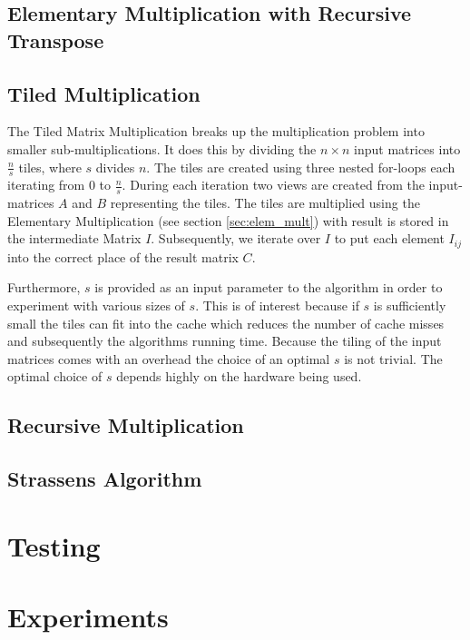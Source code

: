 \documentclass[12pt, a4paper]{article}
\begin{document}
\subsection{Elementary Multiplication with Recursive Transpose}
\label{sec:transpose}

\subsection{Tiled Multiplication}

The Tiled Matrix Multiplication breaks up the multiplication problem into smaller sub-multiplications. It does this by dividing the $n \times n$ input matrices into $\frac{n}{s}$ tiles, where $s$ divides $n$. The tiles are created using three nested for-loops each iterating from $0$ to $\frac{n}{s}$. During each iteration two views are created from the input-matrices $A$ and $B$ representing the tiles. The tiles are multiplied using the Elementary Multiplication (see section \ref{sec:elem_mult}) with result is stored in the intermediate Matrix $I$. Subsequently, we iterate over $I$ to put each element $I_{ij}$ into the correct place of the result matrix $C$.

Furthermore, $s$ is provided as an input parameter to the algorithm in order to experiment with various sizes of $s$. This is of interest because if $s$ is sufficiently small the tiles can fit into the cache which reduces the number of cache misses and subsequently the algorithms running time. Because the tiling of the input matrices comes with an overhead the choice of an optimal $s$ is not trivial. The optimal choice of $s$ depends highly on the hardware being used.

\subsection{Recursive Multiplication}

\subsection{Strassens Algorithm}

\section{Testing}

\section{Experiments}
\end{document}
